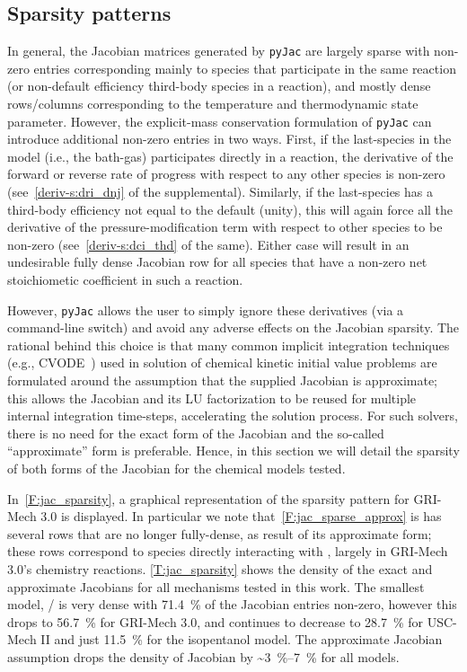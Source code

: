 \documentclass[12pt,number,sort&compress,preprint]{elsarticle}
\begin{document}
\subsection{Sparsity patterns}
\label{S:sparsity}

In general, the Jacobian matrices generated by \texttt{pyJac} are largely sparse with non-zero entries corresponding mainly to species that participate in the same reaction (or non-default efficiency third-body species in a reaction), and mostly dense rows\slash columns corresponding to the temperature and thermodynamic state parameter.
However, the explicit-mass conservation formulation of \texttt{pyJac} can introduce additional non-zero entries in two ways.
First, if the last-species in the model (i.e., the bath-gas) participates directly in a reaction, the derivative of the forward or reverse rate of progress with respect to any other species is non-zero (see~\cref{deriv-s:dri_dnj} of the supplemental).
Similarly, if the last-species has a third-body efficiency not equal to the default (unity), this will again force all the derivative of the pressure-modification term with respect to other species to be non-zero (see~\cref{deriv-s:dci_thd} of the same).
Either case will result in an undesirable fully dense Jacobian row for all species that have a non-zero net stoichiometic coefficient in such a reaction.

However, \texttt{pyJac} allows the user to simply ignore these derivatives (via a command-line switch) and avoid any adverse effects on the Jacobian sparsity.
The rational behind this choice is that many common implicit integration techniques (e.g., CVODE~\cite{Hindmarsh:2005}) used in solution of chemical kinetic initial value problems are formulated around the assumption that the supplied Jacobian is approximate; this allows the Jacobian and its LU factorization to be reused for multiple internal integration time-steps, accelerating the solution process.
For such solvers, there is no need for the exact form of the Jacobian and the so-called ``approximate'' form is preferable.
Hence, in this section we will detail the sparsity of both forms of the Jacobian for the chemical models tested.

In~\cref{F:jac_sparsity}, a graphical representation of the sparsity pattern for GRI-Mech 3.0 is displayed.
In particular we note that~\cref{F:jac_sparse_approx} is has several rows that are no longer fully-dense, as result of its approximate form; these rows correspond to species directly interacting with , largely in GRI-Mech 3.0's  chemistry reactions.
\cref{T:jac_sparsity} shows the density of the exact and approximate Jacobians for all mechanisms tested in this work.
The smallest model, \slash{} is very dense with \SI{71.4}{\percent} of the Jacobian entries non-zero, however this drops to \SI{56.7}{\percent} for GRI-Mech 3.0, and continues to decrease to \SI{28.7}{\percent} for USC-Mech II and just \SI{11.5}{\percent} for the isopentanol model.
The approximate Jacobian assumption drops the density of Jacobian by \textasciitilde\SIrange{3}{7}{\percent} for all models.
\end{document}
